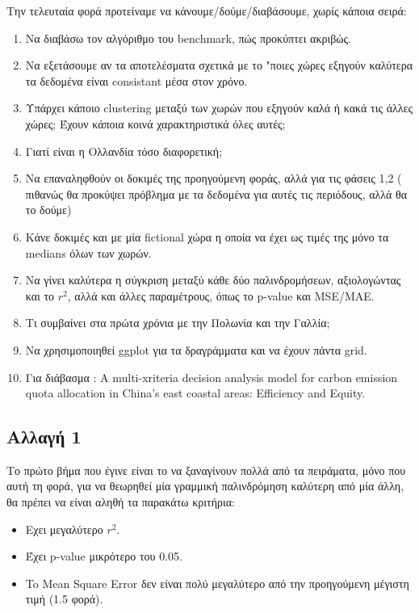 \documentclass[a4paper,twoside,10pt]{article}
\begin{document}
	Την τελευταία φορά προτείναμε να κάνουμε/δούμε/διαβάσουμε, χωρίς κάποια σειρά:
	\begin{enumerate}
		\item Να διαβάσω τον αλγόριθμο του benchmark, πώς προκύπτει ακριβώς.
		\item Να εξετάσουμε αν τα αποτελέσματα σχετικά με το "ποιες χώρες εξηγούν καλύτερα τα δεδομένα είναι consistant μέσα στον χρόνο.
		\item Υπάρχει κάποιο clustering μεταξύ των χωρών που εξηγούν καλά ή κακά τις άλλες χώρες; Έχουν κάποια κοινά χαρακτηριστικά όλες αυτές;
		\item Γιατί είναι η Ολλανδία τόσο διαφορετική;
		\item Να επαναληφθούν οι δοκιμές της προηγούμενη φοράς, αλλά για τις φάσεις 1,2 ( πιθανώς θα προκύψει πρόβλημα με τα δεδομένα για αυτές τις περιόδους, αλλά θα το δούμε)
		\item Κάνε δοκιμές και με μία fictional χώρα η οποία να έχει ως τιμές της μόνο τα medians όλων των χωρών. 
		\item Να γίνει καλύτερα η σύγκριση μεταξύ κάθε δύο παλινδρομήσεων, αξιολογώντας και το $r^2$, αλλά και άλλες παραμέτρους, όπως το p-value και MSE/MAE.
		\item Τι συμβαίνει στα πρώτα χρόνια με την Πολωνία και την Γαλλία;
		\item Να χρησιμοποιηθεί ggplot για τα δραγράμματα και να έχουν πάντα grid.
		\item Για διάβασμα : A multi-xriteria decision analysis model for carbon emission quota allocation in China's east coastal areas: Efficiency and Equity.
		
	\end{enumerate}
	
	\subsection{Αλλαγή 1}
	Το πρώτο βήμα που έγινε είναι το να ξαναγίνουν πολλά από τα πειράματα, μόνο που αυτή τη φορά, για να θεωρηθεί μία γραμμική παλινδρόμηση καλύτερη από μία άλλη, θα πρέπει να είναι αληθή τα παρακάτω κριτήρια:
	\begin{itemize}
		\item Εχει μεγαλύτερο $r^2$.
		\item Έχει p-value μικρότερο του 0.05.
		\item To Mean Square Error δεν είναι πολύ μεγαλύτερο από την προηγούμενη μέγιστη τιμή (1.5 φορά).
	\end{itemize}
	
\end{document}

